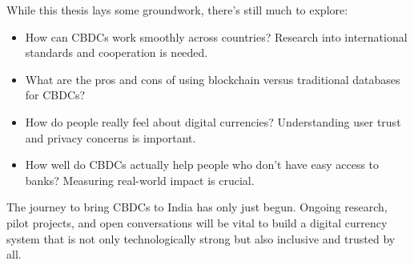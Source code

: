 While this thesis lays some groundwork, there’s still much to explore:

\begin{itemize}
    \item How can CBDCs work smoothly across countries? Research into international standards and cooperation is needed.
    \item What are the pros and cons of using blockchain versus traditional databases for CBDCs?
    \item How do people really feel about digital currencies? Understanding user trust and privacy concerns is important.
    \item How well do CBDCs actually help people who don’t have easy access to banks? Measuring real-world impact is crucial.
\end{itemize}

The journey to bring CBDCs to India has only just begun. Ongoing research, pilot projects, and open conversations will be vital to build a digital currency system that is not only technologically strong but also inclusive and trusted by all.

